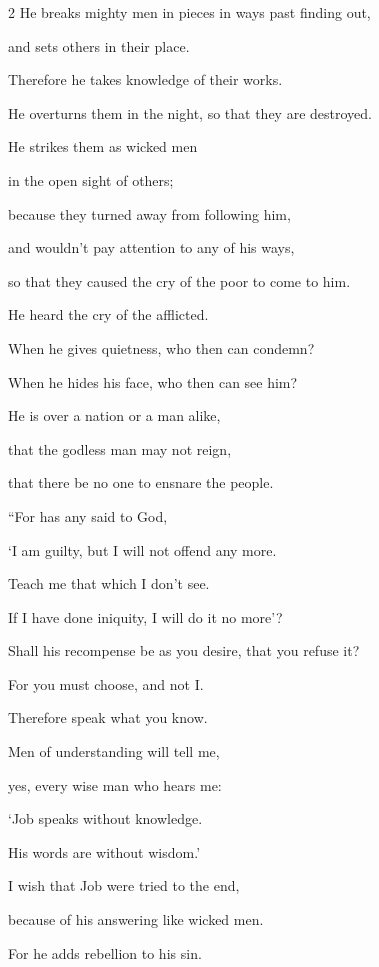 \begin{multicols}{2}
	\myverse{}He breaks mighty men in pieces in ways past finding out,
	
	and sets others in their place.
	
	\myverse{}Therefore he takes knowledge of their works.
	
	He overturns them in the night, so that they are destroyed.
	
	\myverse{}He strikes them as wicked men
	
	in the open sight of others;
	
	\myverse{}because they turned away from following him,
	
	and wouldn’t pay attention to any of his ways,
	
	\myverse{}so that they caused the cry of the poor to come to him.
	
	He heard the cry of the afflicted.
	
	\myverse{}When he gives quietness, who then can condemn?
	
	When he hides his face, who then can see him?
	
	He is over a nation or a man alike,
	
	\myverse{}that the godless man may not reign,
	
	that there be no one to ensnare the people.
	
	\vspace{\baselineskip}
	
	\myverse{}“For has any said to God,
	
	‘I am guilty, but I will not offend any more.
	
	\myverse{}Teach me that which I don’t see.
	
	If I have done iniquity, I will do it no more’?
	
	\myverse{}Shall his recompense be as you desire, that you refuse it?
	
	For you must choose, and not I.
	
	Therefore speak what you know.
	
	\myverse{}Men of understanding will tell me,
	
	yes, every wise man who hears me:
	
	\myverse{}‘Job speaks without knowledge.
	
	His words are without wisdom.’
	
	\myverse{}I wish that Job were tried to the end,
	
	because of his answering like wicked men.
	
	\myverse{}For he adds rebellion to his sin.
	

\end{multicols}
